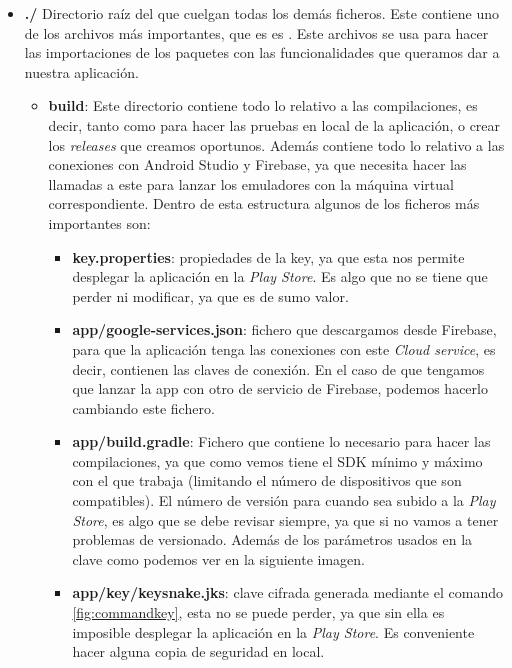 \begin{itemize}
\item \textbf{./}
Directorio raíz del que cuelgan todas los demás ficheros. Este contiene uno de los archivos más importantes, que es es . Este archivos se usa para hacer las importaciones de los paquetes con las funcionalidades que queramos dar a nuestra aplicación.

\begin{itemize}
	\item \textbf{build}: Este directorio contiene todo lo relativo a las compilaciones, es decir, tanto como para hacer las pruebas en local de la aplicación, o crear los \emph{releases} que creamos oportunos. Además contiene todo lo relativo a las conexiones con Android Studio y Firebase, ya que necesita hacer las llamadas a este para lanzar los emuladores con la máquina virtual correspondiente. Dentro de esta estructura algunos de los ficheros más importantes son:
	\begin{itemize}
		\item \textbf{key.properties}: propiedades de la key, ya que esta nos permite desplegar la aplicación en la \emph{Play Store}. Es algo que no se tiene que perder ni modificar, ya que es de sumo valor. 
		\item \textbf{app/google-services.json}: fichero que descargamos desde Firebase, para que la aplicación tenga las conexiones con este \emph{Cloud service}, es decir, contienen las claves de conexión. En el caso de que tengamos que lanzar la app con otro de servicio de Firebase, podemos hacerlo cambiando este fichero.
		\item \textbf{app/build.gradle}: Fichero que contiene lo necesario para hacer las compilaciones, ya que como vemos tiene el SDK mínimo y máximo con el que trabaja (limitando el número de dispositivos que son compatibles). El número de versión para cuando sea subido a la \emph{Play Store}, es algo que se debe revisar siempre, ya que si no vamos a tener problemas de versionado. Además de los parámetros usados en la clave como podemos ver en la siguiente imagen.
		\item \textbf{app/key/keysnake.jks}: clave cifrada generada mediante el comando \ref{fig:commandkey}, esta no se puede perder, ya que sin ella es imposible desplegar la aplicación en la \emph{Play Store}. Es conveniente hacer alguna copia de seguridad en local.
		

\end{itemize}
\end{itemize}
\end{itemize}
